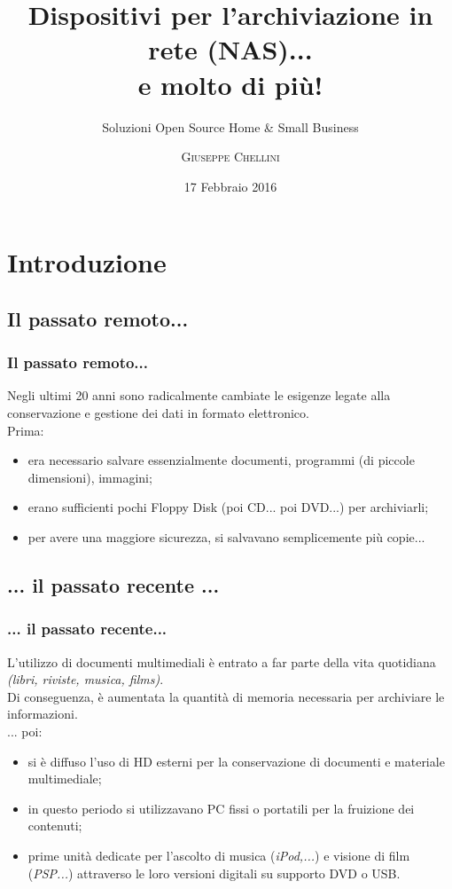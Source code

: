 \documentclass[11pt,xcolor=table]{beamer}
\title[Nas... e molto di più!]{Dispositivi per l'archiviazione in rete (NAS)... \\ e molto di più!}
\subtitle{Soluzioni Open Source Home \& Small Business}
\author{\textsc{Giuseppe Chellini}}
\institute[GULP]{GULP - Gruppo Utenti Linux Pisa}
\date{17 Febbraio 2016}
\begin{document}
	\begin{frame}
		\titlepage
	\end{frame}

\section{Introduzione}

\subsection{Il passato remoto...}

\begin{frame}
	\frametitle{Il passato remoto...}
	Negli ultimi 20 anni sono radicalmente cambiate le esigenze legate alla conservazione e gestione dei dati in formato elettronico.\\
	\vspace{0.3cm}
	Prima:
	\begin{itemize}
		\item era necessario salvare essenzialmente documenti, programmi (di piccole dimensioni), immagini;
		\item erano sufficienti pochi Floppy Disk (poi CD... poi DVD...) per archiviarli;
		\item per avere una maggiore sicurezza, si salvavano semplicemente più copie...
	\end{itemize}
\end{frame}

\subsection{... il passato recente ...}

\begin{frame}
	\frametitle{... il passato recente...}
	
	L'utilizzo di documenti multimediali è entrato a far parte della vita quotidiana \textit{(libri, riviste, musica, films)}.\\ 
	Di conseguenza, è aumentata la quantità di memoria necessaria per archiviare le informazioni.\\
	
	\vspace{0.3cm}
	... poi:
	\begin{itemize}
		\item si è diffuso l'uso di HD esterni per la conservazione di documenti e materiale multimediale;
		\item in questo periodo si utilizzavano PC fissi o portatili per la fruizione dei contenuti;
		\item prime unità dedicate per l'ascolto di musica (\textit{iPod,...}) e visione di film (\textit{PSP...}) attraverso le loro versioni digitali su supporto DVD o USB.
	\end{itemize}
\end{frame}
\end{document}
